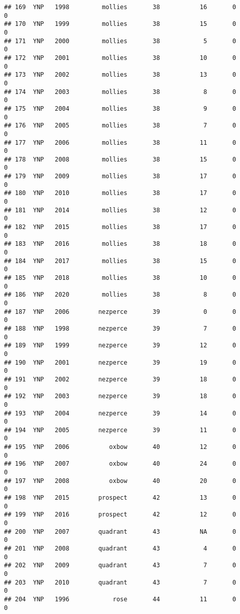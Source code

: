 \documentclass[
]{article}
\begin{document}
\begin{verbatim}
## 169  YNP   1998         mollies       38           16       0        0
## 170  YNP   1999         mollies       38           15       0        0
## 171  YNP   2000         mollies       38            5       0        0
## 172  YNP   2001         mollies       38           10       0        0
## 173  YNP   2002         mollies       38           13       0        0
## 174  YNP   2003         mollies       38            8       0        0
## 175  YNP   2004         mollies       38            9       0        0
## 176  YNP   2005         mollies       38            7       0        0
## 177  YNP   2006         mollies       38           11       0        0
## 178  YNP   2008         mollies       38           15       0        0
## 179  YNP   2009         mollies       38           17       0        0
## 180  YNP   2010         mollies       38           17       0        0
## 181  YNP   2014         mollies       38           12       0        0
## 182  YNP   2015         mollies       38           17       0        0
## 183  YNP   2016         mollies       38           18       0        0
## 184  YNP   2017         mollies       38           15       0        0
## 185  YNP   2018         mollies       38           10       0        0
## 186  YNP   2020         mollies       38            8       0        0
## 187  YNP   2006        nezperce       39            0       0        0
## 188  YNP   1998        nezperce       39            7       0        0
## 189  YNP   1999        nezperce       39           12       0        0
## 190  YNP   2001        nezperce       39           19       0        0
## 191  YNP   2002        nezperce       39           18       0        0
## 192  YNP   2003        nezperce       39           18       0        0
## 193  YNP   2004        nezperce       39           14       0        0
## 194  YNP   2005        nezperce       39           11       0        0
## 195  YNP   2006           oxbow       40           12       0        0
## 196  YNP   2007           oxbow       40           24       0        0
## 197  YNP   2008           oxbow       40           20       0        0
## 198  YNP   2015        prospect       42           13       0        0
## 199  YNP   2016        prospect       42           12       0        0
## 200  YNP   2007        quadrant       43           NA       0        0
## 201  YNP   2008        quadrant       43            4       0        0
## 202  YNP   2009        quadrant       43            7       0        0
## 203  YNP   2010        quadrant       43            7       0        0
## 204  YNP   1996            rose       44           11       0        0

\end{verbatim}
\end{document}
